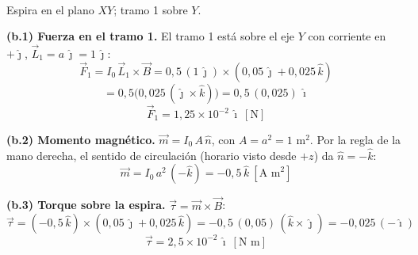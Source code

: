 \documentclass[12pt,letterpaper]{article}
\begin{document}
\medskip
\noindent
\begin{minipage}[t]{0.36\textwidth}
\centering
\vspace{0pt}
\\[2pt]
{\scriptsize Espira en el plano $XY$; tramo 1 sobre $Y$.}
\end{minipage}%
\hfill
\begin{minipage}[t]{0.60\textwidth}
\vspace{0pt}
\textbf{(b.1) Fuerza en el tramo 1.} El tramo 1 est\'a sobre el eje $Y$ con corriente en $+\hat\jmath$,
$\vec L_1 = a\,\hat\jmath = 1\,\hat\jmath$:
\[
    \vec F_1 = I_0\,\vec L_1\times\vec B = 0{,}5\,(1\,\hat\jmath)\times(0{,}05\,\hat\jmath+0{,}025\,\hat k)
\]
\[
    = 0{,}5\big(0{,}025\,(\hat\jmath\times\hat k)\big) = 0{,}5\,(0{,}025)\,\hat\imath
\]
\[
    \boxed{\vec F_1 = 1{,}25\times10^{-2}\,\hat\imath\ [\text{N}]}
\]
\end{minipage}

\medskip
\noindent\textbf{(b.2) Momento magn\'etico.} $\vec m = I_0\,A\,\hat n$, con $A=a^2=1$ m$^2$. Por la regla
de la mano derecha, el sentido de circulaci\'on (horario visto desde $+z$) da $\hat n = -\hat k$:
\[
    \boxed{\vec m = I_0\,a^2\,(-\hat k) = -0{,}5\,\hat k\ [\text{A m}^2]}
\]

\medskip
\noindent\textbf{(b.3) Torque sobre la espira.} $\vec\tau = \vec m\times\vec B$:
\[
    \vec\tau = (-0{,}5\,\hat k)\times(0{,}05\,\hat\jmath + 0{,}025\,\hat k)
    = -0{,}5\,(0{,}05)\,(\hat k\times\hat\jmath)
    = -0{,}025\,(-\hat\imath)
\]
\[
    \boxed{\vec\tau = 2{,}5\times10^{-2}\,\hat\imath\ [\text{N m}]}
\]
\end{document}
